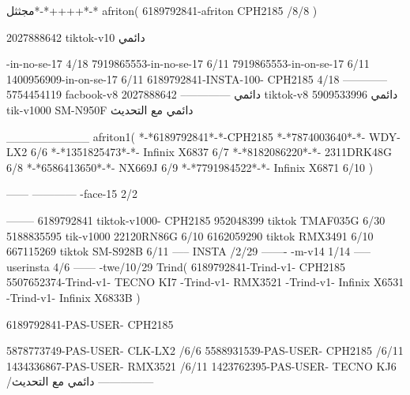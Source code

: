 مجثثل*-*++++*-*
afriton(
6189792841-afriton CPH2185  /8/8
)

2027888642 tiktok-v10
دائمي

-in-no-se-17 4/18
7919865553-in-no-se-17 6/11
7919865553-in-on-se-17 6/11
1400956909-in-on-se-17 6/11
6189792841-INSTA-100- CPH2185 4/18
------------
5754454119 facbook-v8
دائمي
--------------
2027888642 tiktok-v8
دائمي
5909533996 tik-v1000  SM-N950F
دائمي مع التحديث

__________
afriton1(
*-*6189792841*-*-CPH2185
*-*7874003640*-*- WDY-LX2  6/6
*-*1351825473*-*- Infinix X6837  6/7
*-*8182086220*-*- 2311DRK48G  6/8
*-*6586413650*-*- NX669J  6/9
*-*7791984522*-*- Infinix X6871  6/10
)


------
------------
-face-15 2/2

--------
6189792841 tiktok-v1000- CPH2185 
952048399 tiktok TMAF035G  6/30
5188835595 tik-v1000 22120RN86G  6/10
6162059290 tiktok RMX3491  6/10
667115269 tiktok  SM-S928B  6/11
-----
 INSTA /2/29
-------
-m-v14 1/14
-----
userinsta 4/6
------
-twe/10/29
Trind(
6189792841-Trind-v1- CPH2185 
5507652374-Trind-v1- TECNO KI7 \6-Trind-v1- RMX3521 \6-Trind-v1-  Infinix X6531 \6-Trind-v1-   Infinix X6833B \6
)


6189792841-PAS-USER- CPH2185 

5878773749-PAS-USER- CLK-LX2  /6/6
5588931539-PAS-USER- CPH2185  /6/11
1434336867-PAS-USER- RMX3521  /6/11
1423762395-PAS-USER- TECNO KJ6  /دائمي مع التحديث
    ---------------
